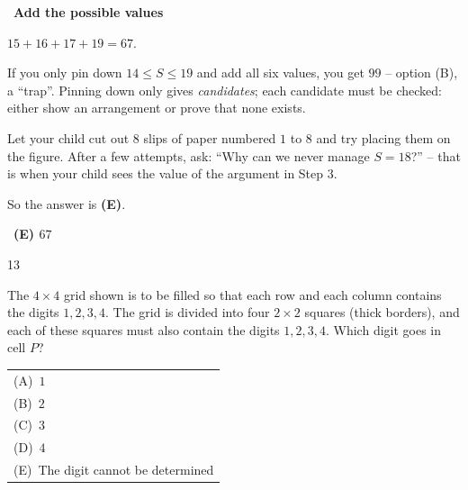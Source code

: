 \documentclass[11pt]{article}
\makeatletter
\providecommand{\AnsWord}{Đáp số}
\newenvironment{probbox}[2]{\begin{probboxT}{#1}{#2}}{\end{probboxT}}
\newcommand{\ans}[1]{\par\smallskip{\bfseries\color{tmGreen!88!black}\AnsWord:}\ {\bfseries\color{AnsRed}#1}\par}
\newcommand{\step}[2]{\par\smallskip\noindent{\bfseries\color{tmBlue!85!black}\StepWord~#1.}\ {\bfseries #2}\par\nopagebreak}
\newcommand{\choicesL}[5]{\par\smallskip\noindent
  \begin{tabular}{@{}l@{}}(A)\ #1\\(B)\ #2\\(C)\ #3\\(D)\ #4\\(E)\ #5\end{tabular}\par}
\def\AnsWord{Answer}
\def\StepWord{Step}
\makeatother
\begin{document}
{\step{5}{Add the possible values}
$15 + 16 + 17 + 19 = 67$.
\begin{warnbox}If you only pin down $14 \le S \le 19$ and add all six values, you get $99$ -- option (B), a ``trap''. Pinning down only gives
\emph{candidates}; each candidate must be checked: either show an arrangement or prove that none exists.\end{warnbox}
\begin{parentbox}Let your child cut out $8$ slips of paper numbered $1$ to $8$ and try placing them on the figure. After a few attempts, ask:
``Why can we never manage $S = 18$?'' -- that is when your child sees the value of the argument in Step 3.\end{parentbox}
So the answer is \textbf{(E)}.
\ans{(E) $67$}
}

\begin{probbox}{13}{\relax}
\begin{minipage}[t]{0.62\linewidth}
The $4\times 4$ grid shown is to be filled so that each row and each column contains the digits $1, 2, 3, 4$. The grid is divided into four
$2\times 2$ squares (thick borders), and each of these squares must also contain the digits $1, 2, 3, 4$. Which digit goes in cell $P$?
\choicesL{$1$}{$2$}{$3$}{$4$}{The digit cannot be determined}
\end{minipage}\hfill
\begin{minipage}[t]{0.33\linewidth}\vspace{4pt}\centering
{}
\end{minipage}
\end{probbox}
\end{document}
